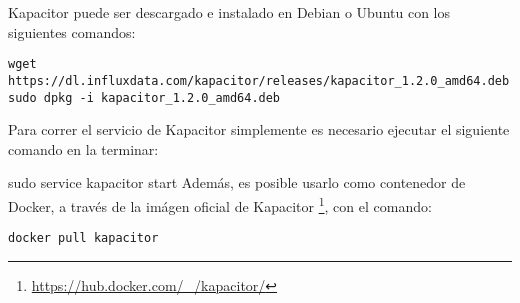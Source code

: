 Kapacitor puede ser descargado e instalado en Debian o Ubuntu con los siguientes comandos:

\begin{lstlisting}
wget https://dl.influxdata.com/kapacitor/releases/kapacitor_1.2.0_amd64.deb
sudo dpkg -i kapacitor_1.2.0_amd64.deb
\end{lstlisting}

Para correr el servicio de Kapacitor simplemente es necesario ejecutar el siguiente comando en la terminar:

sudo service kapacitor start
Además, es posible usarlo como contenedor de Docker, a través de la imágen oficial de Kapacitor \footnote{\url{https://hub.docker.com/_/kapacitor/}}, con el comando:

\begin{lstlisting}
docker pull kapacitor
\end{lstlisting}

